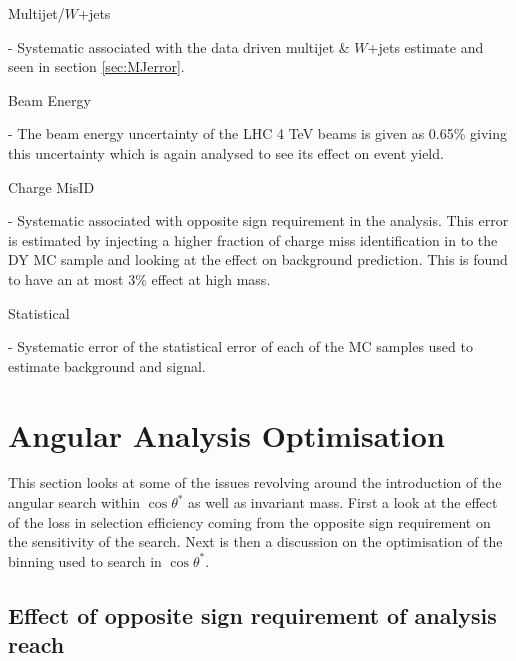     {\bf\raggedright Multijet/$W$+jets} - Systematic associated with the data driven multijet \& $W$+jets estimate and seen in section \ref{sec:MJerror}. \\
    {\bf\raggedright Beam Energy} - The beam energy uncertainty of the LHC 4 TeV beams is given as 0.65\% giving this uncertainty which is again analysed to see its effect on event yield. \\
    {\bf\raggedright Charge MisID} - Systematic associated with opposite sign requirement in the analysis. This error is estimated by injecting a higher fraction of charge miss identification in to the DY MC sample and looking at the effect on background prediction. This is found to have an at most 3\% effect at high mass. \\
    {\bf\raggedright Statistical} - Systematic error of the statistical error of each of the MC samples used to estimate background and signal. \\






\section{Angular Analysis Optimisation}

This section looks at some of the issues revolving around the introduction of the angular search within $\cos{\theta^{*}}$ as well as invariant mass. First a look at the effect of the loss in selection efficiency coming from the opposite sign requirement on the sensitivity of the search. Next is then a discussion on the optimisation of the binning used to search in $\cos{\theta^{*}}$.

\subsection{Effect of opposite sign requirement of analysis reach}
    \label{sec:oppSign}

